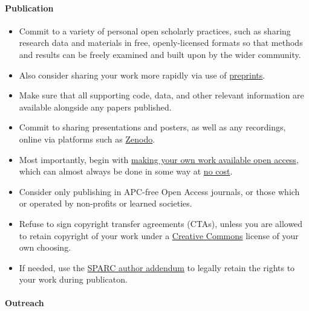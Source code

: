 \paragraph{Publication}\label{publication}

\begin{itemize}
\item
  Commit to a variety of personal open scholarly practices, such as
  sharing research data and materials in free, openly-licensed formats
  so that methods and results can be freely examined and built upon by
  the wider community.
\item
  Also consider sharing your work more rapidly via use of
  \href{https://osf.io/preprints/bitss/796tu/}{preprints}.
\item
  Make sure that all supporting code, data, and other relevant
  information are available alongside any papers published.
\item
  Commit to sharing presentations and posters, as well as any
  recordings, online via platforms such as
  \href{https://zenodo.org/}{Zenodo}.
\item
  Most importantly, begin with
  \href{https://cyber.harvard.edu/hoap/How_to_make_your_own_work_open_access}{making
  your own work available open access}, which can almost always be done
  in some way at
  \href{https://figshare.com/collections/How_to_make_your_work_100_Open_Access_for_free_and_legally_multi-lingual_/3943972}{no
  cost}.
\item
  Consider only publishing in APC-free Open Access journals, or those
  which or operated by non-profits or learned societies.
\item
  Refuse to sign copyright transfer agreements (CTAs), unless you are
  allowed to retain copyright of your work under a
  \href{https://creativecommons.org/licenses}{Creative Commons} license
  of your own choosing.
\item
  If needed, use the
  \href{https://sparcopen.org/our-work/author-rights/brochure-html/}{SPARC
  author addendum} to legally retain the rights to your work during
  publicaton.
\end{itemize}

\paragraph{Outreach}\label{outreach}

